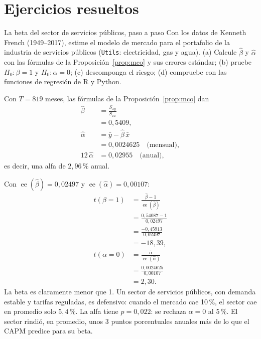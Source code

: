 \section{Ejercicios resueltos}

\begin{ejresuelto}{La beta del sector de servicios públicos, paso a paso}\label{ej:utils}
\enunciado Con los datos de Kenneth French (1949--2017), estime el modelo de mercado para el portafolio de
la industria de servicios públicos (\texttt{Utils}: electricidad, gas y agua). (a) Calcule $\hat\beta$ y
$\hat\alpha$ con las fórmulas de la Proposición~\ref{prop:mco} y sus errores estándar; (b) pruebe
$H_0:\beta=1$ y $H_0:\alpha=0$; (c) descomponga el riesgo; (d) compruebe con las funciones de regresión
de R y Python.

\solucion
{} Con $T=819$ meses, las fórmulas de la Proposición~\ref{prop:mco} dan
\begin{align*}
  \hat\beta  &= \frac{S_{xy}}{S_{xx}}\\
             &= 0{,}5409,\\
  \hat\alpha &= \bar y-\hat\beta\,\bar x\\
             &= 0{,}0024625 \quad\text{(mensual)},\\
  12\,\hat\alpha &= 0{,}02955 \quad\text{(anual)},
\end{align*}
es decir, una alfa de $2{,}96$\,\% anual.

 Con $\operatorname{ee}(\hat\beta)=0{,}02497$ y $\operatorname{ee}(\hat\alpha)=0{,}00107$:
\begin{align*}
  t(\beta=1)  &= \frac{\hat\beta-1}{\operatorname{ee}(\hat\beta)}\\
              &= \frac{0{,}54087-1}{0{,}02497}\\
              &= \frac{-0{,}45913}{0{,}02497}\\
              &= -18{,}39,\\
  t(\alpha=0) &= \frac{\hat\alpha}{\operatorname{ee}(\hat\alpha)}\\
              &= \frac{0{,}0024625}{0{,}00107}\\
              &= 2{,}30 .
\end{align*}
La beta es claramente menor que 1. Un sector de servicios públicos, con demanda estable y tarifas
reguladas, es defensivo: cuando el mercado cae 10\,\%, el sector cae en promedio solo $5{,}4$\,\%. La alfa
tiene $p=0{,}022$: se rechaza $\alpha=0$ al 5\,\%. El sector rindió, en promedio, unos 3 puntos porcentuales
anuales más de lo que el CAPM predice para su beta.


\end{ejresuelto}

